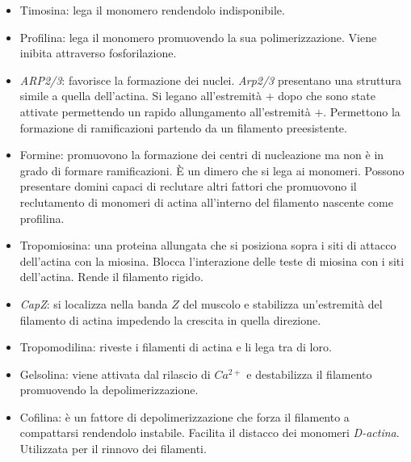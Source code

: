		\begin{multicols}{2}
			\begin{itemize}
				\item Timosina: lega il monomero rendendolo indisponibile.
				\item Profilina: lega il monomero promuovendo la sua polimerizzazione.
					Viene inibita attraverso fosforilazione.
				\item \emph{ARP2/3}: favorisce la formazione dei nuclei.
					\emph{Arp2/3} presentano una struttura simile a quella dell'actina.
					Si legano all'estremit\`a $+$ dopo che sono state attivate permettendo un rapido allungamento all'estremit\`a $+$.
					Permettono la formazione di ramificazioni partendo da un filamento preesistente.
				\item Formine: promuovono la formazione dei centri di nucleazione ma non \`e in grado di formare ramificazioni.
					\`E un dimero che si lega ai monomeri.
					Possono presentare domini capaci di reclutare altri fattori che promuovono il reclutamento di monomeri di actina all'interno del filamento nascente come profilina.
				\item Tropomiosina: una proteina allungata che si posiziona sopra i siti di attacco dell'actina con la miosina.
					Blocca l'interazione delle teste di miosina con i siti dell'actina.
					Rende il filamento rigido.
				\item \emph{CapZ}: si localizza nella banda $Z$ del muscolo e stabilizza un'estremit\`a del filamento di actina impedendo la crescita in quella direzione.
				\item Tropomodilina: riveste i filamenti di actina e li lega tra di loro.
				\item Gelsolina: viene attivata dal rilascio di \emph{$Ca^{2+}$} e destabilizza il filamento promuovendo la depolimerizzazione.
				\item Cofilina: \`e un fattore di depolimerizzazione che forza il filamento a compattarsi rendendolo instabile.
					Facilita il distacco dei monomeri \emph{D-actina}.
					Utilizzata per il rinnovo dei filamenti.
			\end{itemize}
		\end{multicols}
		
			

			
